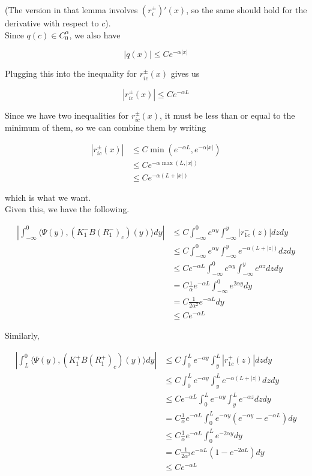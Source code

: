 \documentclass[12pt]{article}
\begin{document}
\begin{enumerate}
(The version in that lemma involves $(r_i^\pm)'(x)$, so the same should hold for the derivative with respect to $c$). \\

Since $q(c) \in C_0^\alpha$, we also have

\[ 
|q(x)| \leq C e^{-\alpha |x|}
\]

Plugging this into the inequality for $r_{ic}^\pm(x)$ gives us

\[
|r_{ic}^\pm(x)| \leq C e^{-\alpha L}
\]

Since we have two inequalities for $r_{ic}^\pm(x)$, it must be less than or equal to the minimum of them, so we can combine them by writing

\begin{align*}
|r_{ic}^\pm(x)| &\leq C \min( e^{-\alpha L}, e^{-\alpha |x|} ) \\
&\leq C e^{-\alpha \max(L, |x|)} \\
&\leq C e^{{-\alpha (L + |x|)}}
\end{align*}

which is what we want.\\

Given this, we have the following.

\begin{align*}
\left| \int_{-\infty}^0 \langle \Psi(y), (K_1^- B (R_1^-)_c)(y) \rangle dy \right| &\leq C \int_{-\infty}^0 e^{\alpha y} \int_{-\infty}^y |r_{1c}^-(z)| dz dy \\
&\leq C \int_{-\infty}^0 e^{\alpha y} \int_{-\infty}^y e^{-\alpha(L + |z|)} dz dy \\
&\leq C e^{-\alpha L} \int_{-\infty}^0 e^{\alpha y} \int_{-\infty}^y e^{\alpha z} dz dy \\
&= C \frac{1}{\alpha} e^{-\alpha L} \int_{-\infty}^0 e^{2 \alpha y} dy \\
&= C \frac{1}{2 \alpha^2 } e^{-\alpha L} dy \\
&\leq C e^{-\alpha L}
\end{align*}

Similarly,

\begin{align*}
\left| \int_{L}^0 \langle \Psi(y), (K_1^+ B (R_1^+)_c)(y) \rangle dy\right| &\leq C \int_0^L e^{-\alpha y} \int_y^L |r_{1c}^+(z)| dz dy \\
&\leq C \int_0^L e^{-\alpha y} \int_y^L e^{-\alpha(L + |z|)} dz dy \\
&\leq C e^{-\alpha L} \int_0^L e^{-\alpha y} \int_y^L e^{-\alpha z} dz dy \\
&= C \frac{1}{\alpha} e^{-\alpha L} \int_0^L e^{-\alpha y} (e^{-\alpha y} - e^{-\alpha L}) dy \\
&\leq C \frac{1}{\alpha} e^{-\alpha L} \int_0^L e^{-2\alpha y} dy \\
&= C \frac{1}{2 \alpha^2 } e^{-\alpha L} (1 - e^{-2aL})dy \\
&\leq C e^{-\alpha L}
\end{align*}


\end{enumerate}
\end{document}
